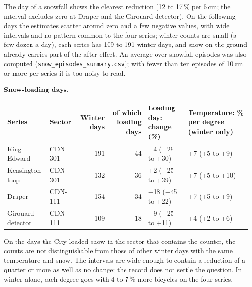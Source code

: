 \documentclass[11pt,a4paper]{article}
\begin{document}
The day of a snowfall shows the clearest reduction (12 to 17\,\% per 5\,cm; the interval excludes zero at Draper and the Girouard detector). On the following days the estimates scatter around zero and a few negative values, with wide intervals and no pattern common to the four series; winter counts are small (a few dozen a day), each series has 109 to 191 winter days, and snow on the ground already carries part of the after-effect. An average over snowfall episodes was also computed (\texttt{snow\_episodes\_summary.csv}); with fewer than ten episodes of 10\,cm or more per series it is too noisy to read.

\textbf{Snow-loading days.}
\begin{center}\small\begin{tabular}{@{}llrrp{3.4cm}p{3.4cm}@{}}\toprule
Series & Sector & Winter days & of which loading days & Loading day: change (\%) & Temperature: \% per degree (winter only)\\\midrule
King Edward & CDN-301 & 191 & 44 & $-$4 ($-$29 to +30) & +7 (+5 to +9) \\
Kensington loop & CDN-301 & 132 & 36 & +2 ($-$25 to +39) & +7 (+5 to +10) \\
Draper & CDN-111 & 154 & 34 & $-$18 ($-$45 to +22) & +7 (+5 to +9) \\
Girouard detector & CDN-111 & 109 & 18 & $-$9 ($-$25 to +11) & +4 (+2 to +6) \\
\bottomrule\end{tabular}\end{center}
On the days the City loaded snow in the sector that contains the counter, the counts are not distinguishable from those of other winter days with the same temperature and snow. The intervals are wide enough to contain a reduction of a quarter or more as well as no change; the record does not settle the question. In winter alone, each degree goes with 4 to 7\,\% more bicycles on the four series.
\end{document}

